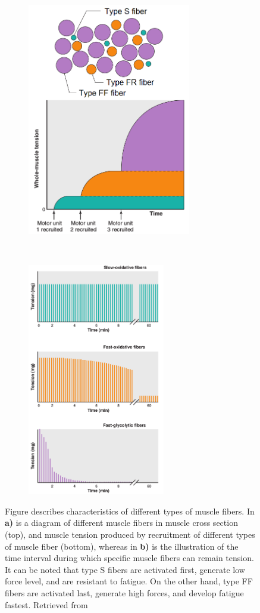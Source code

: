 \begin{figure}[t!]
    \centering
    \begin{subfigure}[t]{0.45\textwidth}
        \centering
        \includegraphics[height=4in]{Images/introduction/fiber_distribution.png}
        \caption{}
    \end{subfigure}%
    ~ 
    \begin{subfigure}[t]{0.45\textwidth}
        \centering
        \includegraphics[height=4in]{Images/introduction/fiber_fatigue.png}
        \caption{}
    \end{subfigure}
    \caption{Figure describes characteristics of different types of muscle fibers. In \textbf{a)} is a diagram of different muscle fibers in muscle cross section (top), and muscle tension produced by recruitment of different types of muscle fiber (bottom), whereas in \textbf{b)} is the illustration of the time interval during which specific muscle fibers can remain tension. It can be noted that type S fibers are activated first, generate low force level, and are resistant to fatigue. On the other hand, type FF fibers are activated last, generate high forces, and develop fatigue fastest. Retrieved from \citep{Widmaier2014}}
\label{fig:fibers}
\end{figure}


